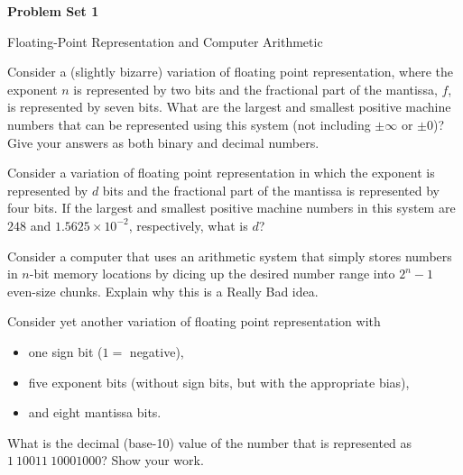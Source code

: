 \documentclass[11pt]{article}
\newcommand{\problem}[1]{\vspace{0.6em}\noindent{\large\bfseries #1.}\hspace{0.45em}}
\newcommand{\answerspace}{\par\vspace{3.5in}}
\begin{document}
\begin{center}
  {\fontsize{25}{30}\selectfont\bfseries Problem Set 1}\par
  \vspace{0.35em}
  {\large\color{gray!75!black}Floating-Point Representation and Computer Arithmetic}
\end{center}
\vspace{0.75em}

\problem{1}
Consider a (slightly bizarre) variation of floating point representation, where the exponent $n$ is represented by two bits and the fractional part of the mantissa, $f$, is represented by seven bits. What are the largest and smallest positive machine numbers that can be represented using this system (not including $\pm\infty$ or $\pm 0$)? Give your answers as both binary and decimal numbers.
\answerspace

\problem{2}
Consider a variation of floating point representation in which the exponent is represented by $d$ bits and the fractional part of the mantissa is represented by four bits. If the largest and smallest positive machine numbers in this system are $248$ and $1.5625\times10^{-2}$, respectively, what is $d$?
\answerspace

\newpage

\problem{3}
Consider a computer that uses an arithmetic system that simply stores numbers in $n$-bit memory locations by dicing up the desired number range into $2^n-1$ even-size chunks. Explain why this is a Really Bad idea.
\answerspace

\problem{4}
Consider yet another variation of floating point representation with
\begin{itemize}[leftmargin=1.65em,itemsep=0.15em,topsep=0.35em]
  \item one sign bit ($1=$ negative),
  \item five exponent bits (without sign bits, but with the appropriate bias),
  \item and eight mantissa bits.
\end{itemize}
What is the decimal (base-10) value of the number that is represented as $1\ 10011\ 10001000$? Show your work.
\answerspace
\end{document}
